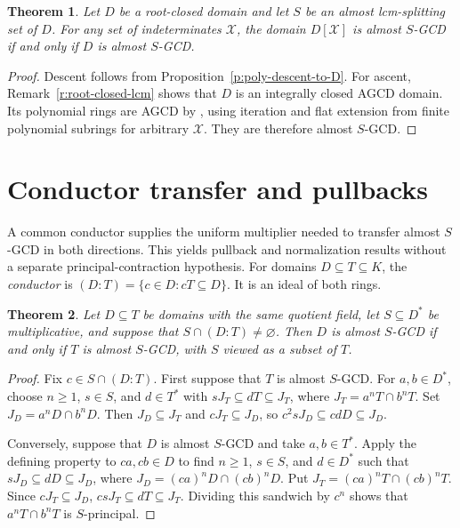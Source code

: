 \documentclass[11pt]{amsart}
\newtheorem{theorem}{Theorem}[section]
\theoremstyle{definition}
\theoremstyle{remark}
\begin{document}
\begin{theorem}\label{t:poly-almost-S-GCD-lcm}
Let $D$ be a root-closed domain and let $S$ be an almost
lcm-splitting set of $D$. For any set of indeterminates
$\mathcal X$, the domain $D[\mathcal X]$ is almost $S$-GCD
if and only if $D$ is almost $S$-GCD.
\end{theorem}
\begin{proof}
Descent follows from Proposition~\ref{p:poly-descent-to-D}.
For ascent, Remark~\ref{r:root-closed-lcm} shows that $D$
is an integrally closed AGCD domain. Its polynomial rings
are AGCD by \cite[Theorem~3.4]{ATZ}, using iteration and
flat extension from finite polynomial subrings for arbitrary
$\mathcal X$. They are therefore almost $S$-GCD.
\end{proof}


\section{Conductor transfer and pullbacks}\label{sec:conductor}

A common conductor supplies the uniform multiplier needed to transfer
almost $S$-GCD in both directions. This yields pullback and
normalization results without a separate principal-contraction
hypothesis.
For domains $D\subseteq T\subseteq K$, the \emph{conductor} is
$(D:T)=\{c\in D:cT\subseteq D\}$. It is an ideal of both rings.

\begin{theorem}\label{t:conductor-transfer}
Let $D\subseteq T$ be domains with the same quotient field, let
$S\subseteq D^\ast$ be multiplicative, and suppose that
$S\cap(D:T)\neq\varnothing$. Then $D$ is almost $S$-GCD if and only
if $T$ is almost $S$-GCD, with $S$ viewed as a subset of $T$.
\end{theorem}

\begin{proof}
Fix $c\in S\cap(D:T)$. First suppose that $T$ is almost $S$-GCD.
For $a,b\in D^\ast$, choose $n\geq1$, $s\in S$, and $d\in T^\ast$
with $sJ_T\subseteq dT\subseteq J_T$, where
$J_T=a^nT\cap b^nT$. Set $J_D=a^nD\cap b^nD$.
Then $J_D\subseteq J_T$ and $cJ_T\subseteq J_D$, so
$c^2sJ_D\subseteq cdD\subseteq J_D$.

Conversely, suppose that $D$ is almost $S$-GCD and take
$a,b\in T^\ast$. Apply the defining property to $ca,cb\in D$ to
find $n\geq1$, $s\in S$, and $d\in D^\ast$ such that
$sJ_D\subseteq dD\subseteq J_D$, where
$J_D=(ca)^nD\cap(cb)^nD$.
Put $J_T=(ca)^nT\cap(cb)^nT$. Since $cJ_T\subseteq J_D$,
$csJ_T\subseteq dT\subseteq J_T$.
Dividing this sandwich by $c^n$ shows that
$a^nT\cap b^nT$ is $S$-principal.
\end{proof}
\end{document}
